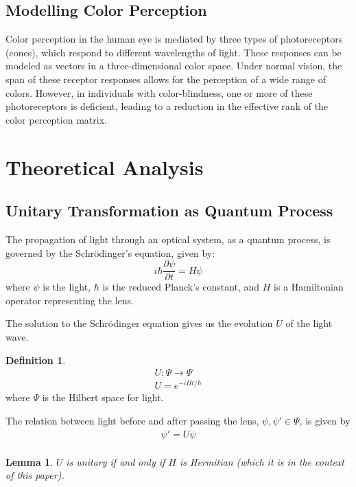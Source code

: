 \documentclass[10pt,a4paper]{article}
\newtheorem{lem}{Lemma}[section]
\theoremstyle{definition}
\newtheorem{defn}{Definition}[section]
\theoremstyle{remark}
\numberwithin{equation}{section}
\begin{document}
\subsection{Modelling Color Perception}
Color perception in the human eye is mediated by three types of photoreceptors (cones), which respond to different wavelengths of light. These responses can be modeled as vectors in a three-dimensional color space. Under normal vision, the span of these receptor responses allows for the perception of a wide range of colors. However, in individuals with color-blindness, one or more of these photoreceptors is deficient, leading to a reduction in the effective rank of the color perception matrix.

\section{Theoretical Analysis}
\subsection{Unitary Transformation as Quantum Process}
The propagation of light through an optical system, as a quantum process, is governed by the Schr\"{o}dinger's equation, given by:
\[
i\hbar \frac{\partial \psi}{\partial t} = H \psi
\]
where \( \psi \) is the light, \( \hbar \) is the reduced Planck's constant, and \( H \) is a Hamiltonian operator representing the lens.

The solution to the Schrödinger equation gives us the evolution $U$ of the light wave.
\begin{defn}
\begin{eqnarray}
U:\Psi \rightarrow \Psi\\
U = e^{-iHt/\hbar}
\end{eqnarray}
where $\Psi$ is the Hilbert space\cite{linearAlgebra} for light. 
\end{defn}

The relation between light before and after passing the lens, $\psi,\psi' \in \Psi$, is given by  
\begin{eqnarray}
\psi' = U \psi \\
\end{eqnarray}
\begin{lem}
$U$ is unitary if and only if $H$ is Hermitian (which it is in the context of this paper). 
\end{lem}
\end{document}
